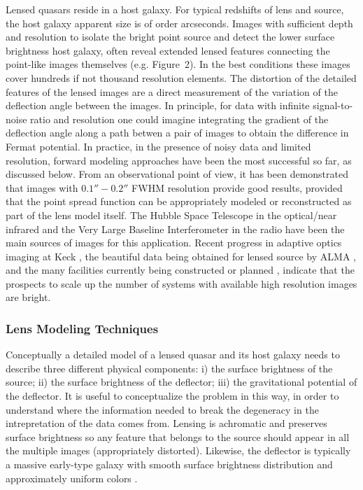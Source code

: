 Lensed quasars reside in a host galaxy. For typical redshifts of lens
and source, the host galaxy apparent size is of order
arcseconds. Images with sufficient depth and resolution to isolate the
bright point source and detect the lower surface brightness host
galaxy, often reveal extended lensed features connecting the
point-like images themselves (e.g. Figure~2). In the best conditions
these images cover hundreds if not thousand resolution elements. The
distortion of the detailed features of the lensed images are a direct
measurement of the variation of the deflection angle between the
images.  In principle, for data with infinite signal-to-noise ratio
and resolution one could imagine integrating the gradient of the
deflection angle along a path betwen a pair of images to obtain the
difference in Fermat potential. In practice, in the presence of noisy
data and limited resolution, forward modeling approaches have been the
most successful so far, as discussed below. From an observational
point of view, it has been demonstrated that images with $0.1''-0.2''$
FWHM resolution provide good results, provided that the point spread
function can be appropriately modeled or reconstructed as part of the
lens model itself. The Hubble Space Telescope in the optical/near
infrared \cite{Suy++10,Suy++13,Suy++14,Birrer} and the Very Large
Baseline Interferometer in the radio \cite{WBB04} have been the main
sources of images for this application. Recent progress in adaptive
optics imaging at Keck \cite{Che++16}, the beautiful data being
obtained for lensed source by ALMA \cite{Hezaveh++13}, and the many
facilities currently being constructed or planned \cite{Men++15},
indicate that the prospects to scale up the number of systems with
available high resolution images are bright.


\subsubsection{Lens Modeling Techniques}

Conceptually a detailed model of a lensed quasar and its host galaxy
needs to describe three different physical components: i) the surface
brightness of the source; ii) the surface brightness of the deflector;
iii) the gravitational potential of the deflector. It is useful to
conceptualize the problem in this way, in order to understand where
the information needed to break the degeneracy in the intrepretation
of the data comes from. Lensing is achromatic and preserves surface
brightness so any feature that belongs to the source \cite[including
in line of sight velocity][]{} should appear in all the multiple
images (appropriately distorted). Likewise, the deflector is typically
a massive early-type galaxy with smooth surface brightness
distribution and approximately uniform colors \cite[except for dust,
see, e.g.][]{Suy++10}.

